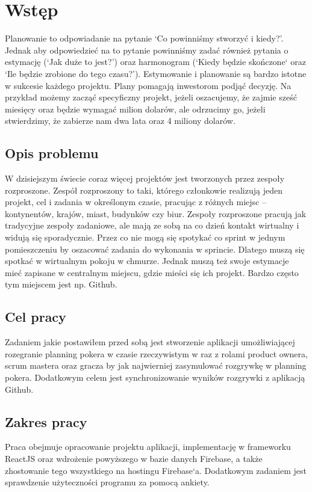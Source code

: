 \chapter*{Wstęp}

Planowanie to odpowiadanie na pytanie `Co powinniśmy stworzyć i kiedy?'.
Jednak aby odpowiedzieć na to pytanie powinniśmy zadać również pytania o estymację
(`Jak duże to jest?') oraz harmonogram (`Kiedy będzie skończone` oraz `Ile będzie zrobione do tego czasu?'). Estymowanie i planowanie są bardzo istotne w sukcesie każdego projektu. Plany pomagają inwestorom podjąć decyzję. Na przykład możemy zacząć specyficzny projekt, jeżeli oszacujemy, że zajmie sześć miesięcy oraz będzie wymagać milion dolarów, ale odrzucimy go, jeżeli stwierdzimy, że zabierze nam dwa lata oraz 4 miliony dolarów.\cite{Cohen_2006}

\section*{Opis problemu}

W dzisiejszym świecie coraz więcej projektów jest tworzonych przez zespoły rozproszone. Zespół rozproszony to taki, którego członkowie realizują jeden projekt, cel i zadania w określonym czasie, pracując z różnych miejsc – kontynentów, krajów, miast, budynków czy biur. Zespoły rozproszone pracują jak tradycyjne zespoły zadaniowe, ale mają ze sobą na co dzień kontakt wirtualny i widują się sporadycznie.\cite{www_rozproszony} Przez co nie mogą się spotykać co sprint w jednym pomieszczeniu by oszacować zadania do wykonania w sprincie. Dlatego muszą się spotkać w wirtualnym pokoju w chmurze. Jednak muszą też swoje estymacje mieć zapisane w centralnym miejscu, gdzie mieści się ich projekt. Bardzo często tym miejscem jest np. Github.

\section*{Cel pracy}

Zadaniem jakie postawiłem przed sobą jest stworzenie aplikacji umożliwiającej rozegranie planning pokera w czasie rzeczywistym w raz z rolami product ownera, scrum mastera oraz gracza by jak najwierniej zasymulować rozgrywkę w planning pokera. Dodatkowym celem jest synchronizowanie wyników rozgrywki z aplikacją Github.

\section*{Zakres pracy}

Praca obejmuje opracowanie projektu aplikacji, implementację w frameworku ReactJS oraz wdrożenie powyższego w bazie danych Firebase, a także zhostowanie tego wszystkiego na hostingu Firebase`a. Dodatkowym zadaniem jest sprawdzenie użyteczności programu za pomocą ankiety.
